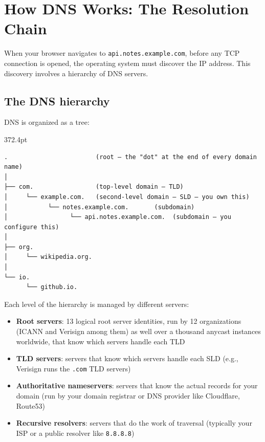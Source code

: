 \setcounter{section}{0}
\section{How DNS Works: The Resolution Chain}\label{27-domain-and-dns:271-how-dns-works-the-resolution-chain}

When your browser navigates to \texttt{api.notes.example.com}, before any TCP connection is opened, the operating system must discover the IP address. This discovery involves a hierarchy of DNS servers.

\subsection*{The DNS hierarchy}\label{27-domain-and-dns:the-dns-hierarchy}

DNS is organized as a tree:

\begin{diagrambox}[short]{372.4pt}
\begin{Verbatim}[fontsize=\fontsize{9.0}{8.55}\selectfont]
.                        (root — the "dot" at the end of every domain name)
│
├── com.                 (top-level domain — TLD)
│     └── example.com.   (second-level domain — SLD — you own this)
│           └── notes.example.com.       (subdomain)
│                 └── api.notes.example.com.  (subdomain — you configure this)
│
├── org.
│     └── wikipedia.org.
│
└── io.
      └── github.io.
\end{Verbatim}
\end{diagrambox}

\noindent{}Each level of the hierarchy is managed by different servers:

\begin{itemize}
\tightlist
\item
  \textbf{Root servers}: 13 logical root server identities, run by 12 organizations (ICANN and Verisign among them) as well over a thousand anycast instances worldwide, that know which servers handle each TLD
\item
  \textbf{TLD servers}: servers that know which servers handle each SLD (e.g., Verisign runs the \texttt{.com} TLD servers)
\item
  \textbf{Authoritative nameservers}: servers that know the actual records for your domain (run by your domain registrar or DNS provider like Cloudflare, Route53)
\item
  \textbf{Recursive resolvers}: servers that do the work of traversal (typically your ISP or a public resolver like \texttt{8.8.8.8})
\end{itemize}

